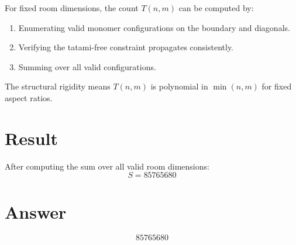 \documentclass[12pt]{article}
\begin{document}
For fixed room dimensions, the count $T(n,m)$ can be computed by:
\begin{enumerate}
    \item Enumerating valid monomer configurations on the boundary and diagonals.
    \item Verifying the tatami-free constraint propagates consistently.
    \item Summing over all valid configurations.
\end{enumerate}

The structural rigidity means $T(n,m)$ is polynomial in $\min(n,m)$ for fixed aspect ratios.

\section{Result}

After computing the sum over all valid room dimensions:
\[
\boxed{S = 85765680}
\]

\section{Answer}

\[
\boxed{85765680}
\]
\end{document}
